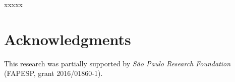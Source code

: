 \documentclass[preprint,authoryear]{elsarticle}
\begin{document}
xxxxx

\section*{Acknowledgments}

This research was partially supported by \textit{S\~{a}o Paulo Research Foundation} (FAPESP, grant 2016/01860-1).




\end{document}
